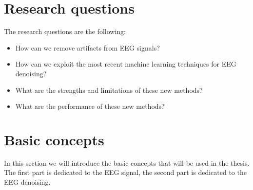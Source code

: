 \documentclass[a4paper]{sapthesis}
\begin{document}
\section{Research questions}
The research questions are the following:
\begin{itemize}
\item How can we remove artifacts from EEG signals?
\item How can we exploit the most recent machine learning techniques for
    EEG denoising?
\item What are the strengths and limitations of these new methods?
\item What are the performance of these new methods?
\end{itemize}
\section{Basic concepts}
In this section we will introduce the basic concepts that will be used 
in the thesis. The first part is dedicated to the EEG signal, the second
part is dedicated to the EEG denoising.
\end{document}
